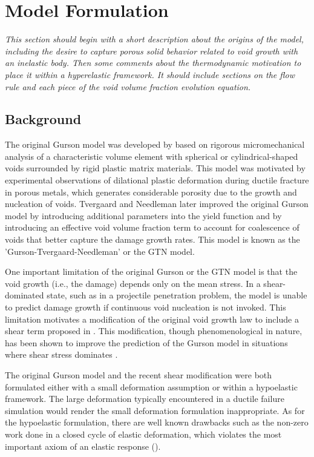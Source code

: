\chapter{Model Formulation}
\label{model-form}

\textit{This section should begin with a short description about the
  origins of the model, including the desire to capture porous solid
  behavior related to void growth with an inelastic body. Then some
  comments about the thermodynamic motivation to place it within a
  hyperelastic framework. It should include sections on the flow rule
  and each piece of the void volume fraction evolution equation.}

\section{Background}

The original Gurson model was developed by \cite{Gurson1977} based on
rigorous micromechanical analysis of a characteristic volume element
with spherical or cylindrical-shaped voids surrounded by rigid plastic
matrix materials. This model was motivated by experimental
observations of dilational plastic deformation during ductile fracture
in porous metals, which generates considerable porosity due to the
growth and nucleation of voids. Tvergaard and Needleman
\cite{Tvergaard1984} later improved the original Gurson model by
introducing additional parameters into the yield function and by
introducing an effective void volume fraction term to account for
coalescence of voids that better capture the damage growth rates. This
model is known as the 'Gurson-Tvergaard-Needleman' or the GTN model.

One important limitation of the original Gurson or the GTN model is
that the void growth (i.e., the damage) depends only on the mean
stress. In a shear-dominated state, such as in a projectile
penetration problem, the model is unable to predict damage growth if
continuous void nucleation is not invoked. This limitation motivates a
modification of the original void growth law to include a shear term
proposed in \cite{Nahshon2008}. This modification, though
phenomenological in nature, has been shown to improve the prediction
of the Gurson model in situations where shear stress dominates
\cite{Nahshon2008,Nahshon2009}.

The original Gurson model and the recent shear modification were both
formulated either with a small deformation assumption or within a
hypoelastic framework. The large deformation typically encountered in
a ductile failure simulation would render the small deformation
formulation inappropriate. As for the hypoelastic formulation, there
are well known drawbacks such as the non-zero work done in a closed
cycle of elastic deformation, which violates the most important axiom
of an elastic response (\cite{Belytschko2013}).

